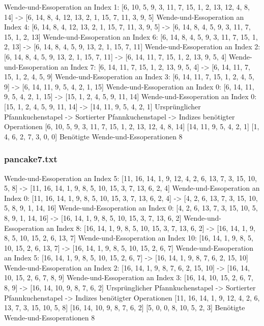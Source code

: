 {    Wende-und-Essoperation an Index 1: [6, 10, 5, 9, 3, 11, 7, 15, 1, 2, 13, 12, 4, 8, 14] -> [6, 14, 8, 4, 12, 13, 2, 1, 15, 7, 11, 3, 9, 5]
    Wende-und-Essoperation an Index 4: [6, 14, 8, 4, 12, 13, 2, 1, 15, 7, 11, 3, 9, 5] -> [6, 14, 8, 4, 5, 9, 3, 11, 7, 15, 1, 2, 13]
    Wende-und-Essoperation an Index 6: [6, 14, 8, 4, 5, 9, 3, 11, 7, 15, 1, 2, 13] -> [6, 14, 8, 4, 5, 9, 13, 2, 1, 15, 7, 11]
    Wende-und-Essoperation an Index 2: [6, 14, 8, 4, 5, 9, 13, 2, 1, 15, 7, 11] -> [6, 14, 11, 7, 15, 1, 2, 13, 9, 5, 4]
    Wende-und-Essoperation an Index 7: [6, 14, 11, 7, 15, 1, 2, 13, 9, 5, 4] -> [6, 14, 11, 7, 15, 1, 2, 4, 5, 9]
    Wende-und-Essoperation an Index 3: [6, 14, 11, 7, 15, 1, 2, 4, 5, 9] -> [6, 14, 11, 9, 5, 4, 2, 1, 15]
    Wende-und-Essoperation an Index 0: [6, 14, 11, 9, 5, 4, 2, 1, 15] -> [15, 1, 2, 4, 5, 9, 11, 14]
    Wende-und-Essoperation an Index 0: [15, 1, 2, 4, 5, 9, 11, 14] -> [14, 11, 9, 5, 4, 2, 1]
    Ursprünglicher Pfannkuchenstapel -> Sortierter Pfannkuchenstapel -> Indizes benötigter Operationen
    [6, 10, 5, 9, 3, 11, 7, 15, 1, 2, 13, 12, 4, 8, 14]
    [14, 11, 9, 5, 4, 2, 1]
    [1, 4, 6, 2, 7, 3, 0, 0]
    Benötigte Wende-und-Essoperationen 8
    \subsubsection{pancake7.txt}

    Wende-und-Essoperation an Index 5: [11, 16, 14, 1, 9, 12, 4, 2, 6, 13, 7, 3, 15, 10, 5, 8] -> [11, 16, 14, 1, 9, 8, 5, 10, 15, 3, 7, 13, 6, 2, 4]
    Wende-und-Essoperation an Index 0: [11, 16, 14, 1, 9, 8, 5, 10, 15, 3, 7, 13, 6, 2, 4] -> [4, 2, 6, 13, 7, 3, 15, 10, 5, 8, 9, 1, 14, 16]
    Wende-und-Essoperation an Index 0: [4, 2, 6, 13, 7, 3, 15, 10, 5, 8, 9, 1, 14, 16] -> [16, 14, 1, 9, 8, 5, 10, 15, 3, 7, 13, 6, 2]
    Wende-und-Essoperation an Index 8: [16, 14, 1, 9, 8, 5, 10, 15, 3, 7, 13, 6, 2] -> [16, 14, 1, 9, 8, 5, 10, 15, 2, 6, 13, 7]
    Wende-und-Essoperation an Index 10: [16, 14, 1, 9, 8, 5, 10, 15, 2, 6, 13, 7] -> [16, 14, 1, 9, 8, 5, 10, 15, 2, 6, 7]
    Wende-und-Essoperation an Index 5: [16, 14, 1, 9, 8, 5, 10, 15, 2, 6, 7] -> [16, 14, 1, 9, 8, 7, 6, 2, 15, 10]
    Wende-und-Essoperation an Index 2: [16, 14, 1, 9, 8, 7, 6, 2, 15, 10] -> [16, 14, 10, 15, 2, 6, 7, 8, 9]
    Wende-und-Essoperation an Index 3: [16, 14, 10, 15, 2, 6, 7, 8, 9] -> [16, 14, 10, 9, 8, 7, 6, 2]
    Ursprünglicher Pfannkuchenstapel -> Sortierter Pfannkuchenstapel -> Indizes benötigter Operationen
    [11, 16, 14, 1, 9, 12, 4, 2, 6, 13, 7, 3, 15, 10, 5, 8]
    [16, 14, 10, 9, 8, 7, 6, 2]
    [5, 0, 0, 8, 10, 5, 2, 3]
    Benötigte Wende-und-Essoperationen 8
}
